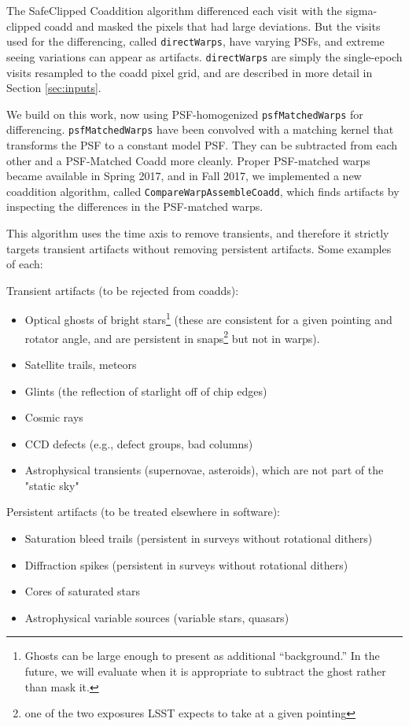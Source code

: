 \documentclass[DM,authoryear,toc]{lsstdoc}
\begin{document}
The SafeClipped Coaddition algorithm differenced each visit with the sigma-clipped coadd and masked the pixels that had large deviations.
But the visits used for the differencing, called \texttt{directWarps}, have varying PSFs, and extreme seeing variations can appear as artifacts.
\texttt{directWarps} are simply the single-epoch visits resampled to the coadd pixel grid, and are described in more detail in Section \ref{sec:inputs}.

We build on this work, now using PSF-homogenized \texttt{psfMatchedWarps} for differencing.
\texttt{psfMatchedWarps} have been convolved with a matching kernel that transforms the PSF to a constant model PSF.
They can be subtracted from each other and a PSF-Matched Coadd more cleanly.
Proper PSF-matched warps became available in Spring 2017, and in Fall 2017, we implemented a new coaddition algorithm, called \texttt{CompareWarpAssembleCoadd}, which finds artifacts by inspecting the differences in the PSF-matched warps.

This algorithm uses the time axis to remove transients, and therefore it strictly targets transient artifacts without removing persistent artifacts.
Some examples of each:

Transient artifacts (to be rejected from coadds):
\begin{itemize}
\item Optical ghosts of bright stars\footnote{Ghosts can be large enough to present as additional ``background.'' In the future, we will evaluate when it is appropriate to subtract the ghost rather than mask it.} (these are consistent for a given pointing and rotator angle, and are persistent in snaps\footnote{one of the two exposures LSST expects to take at a given pointing} but not in warps).
\item Satellite trails, meteors
\item Glints (the reflection of starlight off of chip edges)
\item Cosmic rays
\item CCD defects (e.g., defect groups, bad columns)
\item Astrophysical transients (supernovae, asteroids), which are not part of the "static sky"
\end{itemize}

Persistent artifacts (to be treated elsewhere in software):
\begin{itemize}
\item Saturation bleed trails (persistent in surveys without rotational dithers)
\item Diffraction spikes (persistent in surveys without rotational dithers)
\item Cores of saturated stars
\item Astrophysical variable sources (variable stars, quasars)
\end{itemize}
\end{document}
